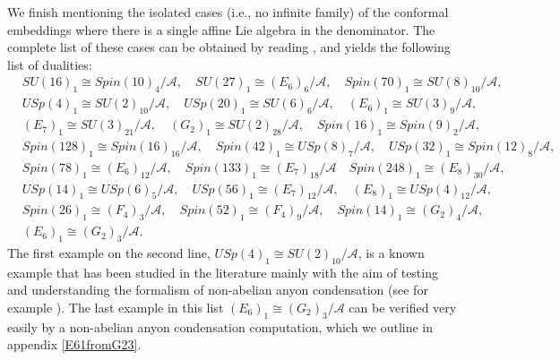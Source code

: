 \documentclass[11pt]{article}
\numberwithin{equation}{section}
\begin{document}
We finish mentioning the isolated cases (i.e., no infinite family) of the conformal embeddings where there is a single affine Lie algebra in the denominator. The complete list of these cases can be obtained by reading \cite{davydov2013witt}, and yields the following list of dualities: 
\begin{align}
    & SU(16)_{1} \cong Spin(10)_{4} / \mathcal{A}, \quad 
    SU(27)_{1} \cong (E_{6})_{6}/ \mathcal{A}, \quad 
    Spin(70)_{1} \cong SU(8)_{10} / \mathcal{A}, \\[0.4cm]
    & USp(4)_{1} \cong SU(2)_{10} / \mathcal{A}, \quad USp(20)_{1} \cong SU(6)_{6}/ \mathcal{A}, \quad (E_{6})_{1} \cong SU(3)_{9} / \mathcal{A},  \\[0.4cm]
    &(E_{7})_{1} \cong SU(3)_{21}/\mathcal{A}, \quad (G_{2})_{1} \cong SU(2)_{28} / \mathcal{A}, \quad Spin(16)_{1} \cong Spin(9)_{2} / \mathcal{A},  \\[0.4cm]
    &Spin(128)_{1} \cong Spin(16)_{16} / \mathcal{A}, \quad Spin(42)_{1} \cong USp(8)_{7}/\mathcal{A}, \quad USp(32)_{1} \cong Spin(12)_{8}/\mathcal{A},  \\[0.4cm]
    &Spin(78)_{1} \cong (E_{6})_{12}/\mathcal{A}, \quad Spin(133)_{1} \cong (E_{7})_{18}/\mathcal{A} \quad Spin(248)_{1} \cong (E_{8})_{30}/\mathcal{A},  \\[0.4cm]
    & USp(14)_{1} \cong USp(6)_{5} / \mathcal{A}, \quad USp(56)_{1} \cong (E_{7})_{12} / \mathcal{A}, \quad (E_{8})_{1} \cong USp(4)_{12} / \mathcal{A}, \\[0.4cm]
    & Spin(26)_{1} \cong (F_{4})_{3} / \mathcal{A}, \quad Spin(52)_{1} \cong (F_{4})_{9}  / \mathcal{A}, \quad Spin(14)_{1} \cong (G_{2})_{4} / \mathcal{A}, \\[0.4cm]
    & (E_{6})_{1} \cong (G_{2})_{3} / \mathcal{A}.
\end{align}
The first example on the second line, $USp(4)_{1} \cong SU(2)_{10}/\mathcal{A}$, is a known example that has been studied in the literature mainly with the aim of testing and understanding the formalism of non-abelian anyon condensation (see for example \cite{Bais:2008ni, Hung:2015hfa, Eliens:2013epa, Yu:2021zmu,neupert2016boson}). The last example in this list $(E_{6})_{1} \cong (G_{2})_{3} / \mathcal{A}$ can be verified very easily by a non-abelian anyon condensation computation, which we outline in appendix \ref{E61fromG23}.
\end{document}
